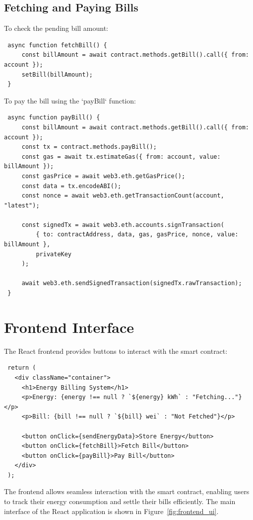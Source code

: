\documentclass[a4paper,12pt]{report}
\begin{document}
 \subsection{Fetching and Paying Bills}
 To check the pending bill amount:
 
 \begin{lstlisting}
 async function fetchBill() {
     const billAmount = await contract.methods.getBill().call({ from: account });
     setBill(billAmount);
 }
 \end{lstlisting}
 
 To pay the bill using the `payBill` function:
 
 \begin{lstlisting}
 async function payBill() {
     const billAmount = await contract.methods.getBill().call({ from: account });
     const tx = contract.methods.payBill();
     const gas = await tx.estimateGas({ from: account, value: billAmount });
     const gasPrice = await web3.eth.getGasPrice();
     const data = tx.encodeABI();
     const nonce = await web3.eth.getTransactionCount(account, "latest");
 
     const signedTx = await web3.eth.accounts.signTransaction(
         { to: contractAddress, data, gas, gasPrice, nonce, value: billAmount },
         privateKey
     );
 
     await web3.eth.sendSignedTransaction(signedTx.rawTransaction);
 }
 \end{lstlisting}
 
 \section{Frontend Interface}
 The React frontend provides buttons to interact with the smart contract:
 
 \begin{lstlisting}
 return (
   <div className="container">
     <h1>Energy Billing System</h1>
     <p>Energy: {energy !== null ? `${energy} kWh` : "Fetching..."}</p>
     <p>Bill: {bill !== null ? `${bill} wei` : "Not Fetched"}</p>
     
     <button onClick={sendEnergyData}>Store Energy</button>
     <button onClick={fetchBill}>Fetch Bill</button>
     <button onClick={payBill}>Pay Bill</button>
   </div>
 );
 \end{lstlisting}
 The frontend allows seamless interaction with the smart contract, enabling users to track their energy consumption and settle their bills efficiently. The main interface of the React application is shown in Figure~\ref{fig:frontend_ui}.
\end{document}
